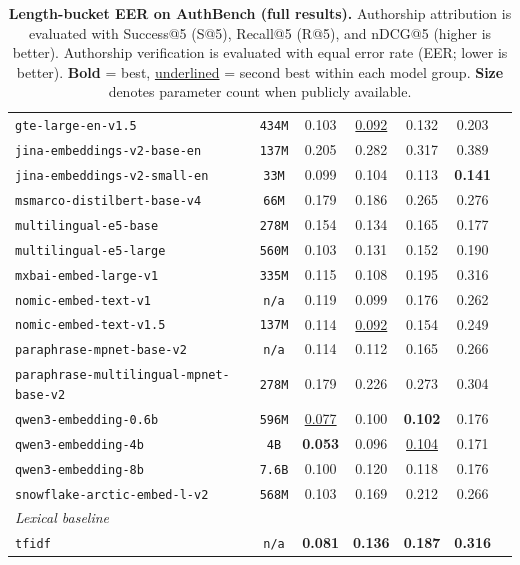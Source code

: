 \documentclass[11pt]{article}
\begin{document}
\begin{table}[htbp]
{\begin{tabular}{lcccccc}
\texttt{gte-large-en-v1.5} & \texttt{434M} & 0.103 & \underline{0.092} & 0.132 & 0.203 \\
\texttt{jina-embeddings-v2-base-en} & \texttt{137M} & 0.205 & 0.282 & 0.317 & 0.389 \\
\texttt{jina-embeddings-v2-small-en} & \texttt{33M} & 0.099 & 0.104 & 0.113 & \textbf{0.141} \\
\texttt{msmarco-distilbert-base-v4} & \texttt{66M} & 0.179 & 0.186 & 0.265 & 0.276 \\
\texttt{multilingual-e5-base} & \texttt{278M} & 0.154 & 0.134 & 0.165 & 0.177 \\
\texttt{multilingual-e5-large} & \texttt{560M} & 0.103 & 0.131 & 0.152 & 0.190 \\
\texttt{mxbai-embed-large-v1} & \texttt{335M} & 0.115 & 0.108 & 0.195 & 0.316 \\
\texttt{nomic-embed-text-v1} & \texttt{n/a} & 0.119 & 0.099 & 0.176 & 0.262 \\
\texttt{nomic-embed-text-v1.5} & \texttt{137M} & 0.114 & \underline{0.092} & 0.154 & 0.249 \\
\texttt{paraphrase-mpnet-base-v2} & \texttt{n/a} & 0.114 & 0.112 & 0.165 & 0.266 \\
\texttt{paraphrase-multilingual-mpnet-base-v2} & \texttt{278M} & 0.179 & 0.226 & 0.273 & 0.304 \\
\texttt{qwen3-embedding-0.6b} & \texttt{596M} & \underline{0.077} & 0.100 & \textbf{0.102} & 0.176 \\
\texttt{qwen3-embedding-4b} & \texttt{4B} & \textbf{0.053} & 0.096 & \underline{0.104} & 0.171 \\
\texttt{qwen3-embedding-8b} & \texttt{7.6B} & 0.100 & 0.120 & 0.118 & 0.176 \\
\texttt{snowflake-arctic-embed-l-v2} & \texttt{568M} & 0.103 & 0.169 & 0.212 & 0.266 \\
\midrule
\multicolumn{6}{l}{\textit{Lexical baseline}} \\
\midrule
\texttt{tfidf} & \texttt{n/a} & \textbf{0.081} & \textbf{0.136} & \textbf{0.187} & \textbf{0.316} \\
\bottomrule
\end{tabular}
}
\caption{\textbf{Length-bucket EER on AuthBench (full results).} Authorship attribution is evaluated with Success@5 (S@5), Recall@5 (R@5), and nDCG@5 (higher is better). Authorship verification is evaluated with equal error rate (EER; lower is better). \textbf{Bold} = best, \underline{underlined} = second best within each model group. \textbf{Size} denotes parameter count when publicly available.}
\label{tab:length-eer5-full}
\end{table}
\end{document}
